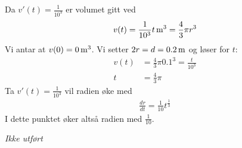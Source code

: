 \documentclass[a4paper,norsk,12pt]{article}
\begin{document}
Da $v'(t) = \frac{1}{10^3}$ er volumet gitt ved
\begin{align*}
  v(t) = \unit[\frac{1}{10^3}t]{m^3} = \frac{4}{3}\pi r^3
\end{align*}
Vi antar at $v(0) = \unit[0]{m^3}$. Vi setter $2r = d = \unit[0.2]{m}$ og løser
for $t$:
\begin{align*}
  v(t) &= \frac{4}{3}\pi 0.1^3 = \frac{t}{10^3} \\
  t &= \frac{4}{3}\pi
\end{align*}
Ta $v'(t) = \frac{1}{10^3}$ vil radien øke med
\begin{align*}
  \frac{dr}{dt} = \frac{1}{10}t^\frac{1}{3}
\end{align*}
I dette punktet øker altså radien med $\frac{1}{10}$.

\textit{Ikke utført}
\end{document}
